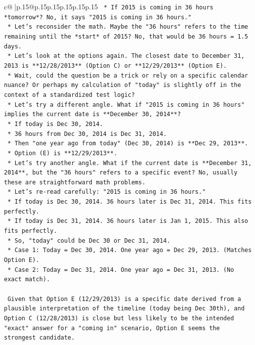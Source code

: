 \documentclass{article}
\begin{document}
{\begin{supertabular}{c@{$\;$}|p{.15\linewidth}@{}p{.15\linewidth}p{.15\linewidth}p{.15\linewidth}p{.15\linewidth}p{.15\linewidth}}
{{{\texttt{    *   If 2015 is coming in 36 hours *tomorrow*? No, it says "2015 is coming in 36 hours."} \\
\texttt{    *   Let's reconsider the math. Maybe the "36 hours" refers to the time remaining until the *start* of 2015? No, that would be 36 hours = 1.5 days.} \\
\texttt{    *   Let's look at the options again. The closest date to December 31, 2013 is **12/28/2013** (Option C) or **12/29/2013** (Option E).} \\
\texttt{    *   Wait, could the question be a trick or rely on a specific calendar nuance? Or perhaps my calculation of "today" is slightly off in the context of a standardized test logic?} \\
\texttt{    *   Let's try a different angle. What if "2015 is coming in 36 hours" implies the current date is **December 30, 2014**?} \\
\texttt{        *   If today is Dec 30, 2014.} \\
\texttt{        *   36 hours from Dec 30, 2014 is Dec 31, 2014.} \\
\texttt{        *   Then "one year ago from today" (Dec 30, 2014) is **Dec 29, 2013**.} \\
\texttt{        *   Option (E) is **12/29/2013**.} \\
\texttt{    *   Let's try another angle. What if the current date is **December 31, 2014**, but the "36 hours" refers to a specific event? No, usually these are straightforward math problems.} \\
\texttt{    *   Let's re{-}read carefully: "2015 is coming in 36 hours."} \\
\texttt{        *   If today is Dec 30, 2014. 36 hours later is Dec 31, 2014. This fits perfectly.} \\
\texttt{        *   If today is Dec 31, 2014. 36 hours later is Jan 1, 2015. This also fits perfectly.} \\
\texttt{    *   So, "today" could be Dec 30 or Dec 31, 2014.} \\
\texttt{    *   Case 1: Today = Dec 30, 2014. One year ago = Dec 29, 2013. (Matches Option E).} \\
\texttt{    *   Case 2: Today = Dec 31, 2014. One year ago = Dec 31, 2013. (No exact match).} \\
\\ 
\texttt{    Given that Option E (12/29/2013) is a specific date derived from a plausible interpretation of the timeline (today being Dec 30th), and Option C (12/28/2013) is close but less likely to be the intended "exact" answer for a "coming in" scenario, Option E seems the strongest candidate.} \\
}}}
\end{supertabular}}
\end{document}
